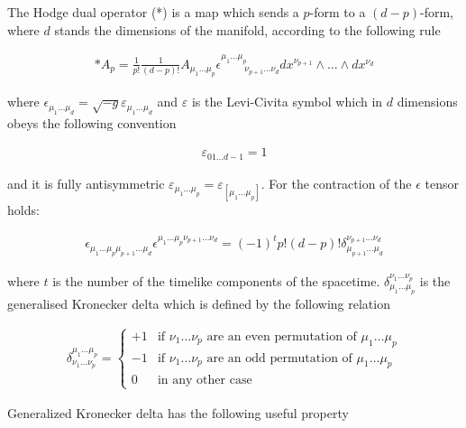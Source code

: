 \documentclass[a4paper,notitlepage]{report}
\begin{document}
The Hodge dual operator (*) is a map which sends a $p$-form to a $(d-p)$-form, where $d$ stands the dimensions of the manifold, according to the following rule

\begin{align}
*A_p = \frac{1}{p!}  \frac{1}{(d-p)!} A_{\mu_{1} \ldots \mu_{p}} \epsilon^{\mu_{1} \ldots \mu_{p}}_{\:\:\:\:\:\:\:\:\:\:\:\: \nu_{p+1} \ldots \nu_{d}} dx^{\nu_{p+1}} \wedge \ldots \wedge dx^{\nu_{d}}
\end{align}

\vspace{0.5em}
where $\epsilon_{\mu_{1} \ldots \mu_{d}} = \sqrt{-g} \varepsilon_{\mu_{1} \ldots \mu_{d}}$ and $\varepsilon$ is the  Levi-Civita symbol which in $d$ dimensions obeys the following convention

\begin{align}
\varepsilon_{0 1 \ldots d-1} = 1
\end{align}

\vspace{0.5em}
and it is fully antisymmetric $\varepsilon_{\mu_{1} \ldots \mu_{p}} = \varepsilon_{[\mu_{1} \ldots \mu_{p}]}$. For the contraction of the $\epsilon$ tensor holds:

\begin{align}
\epsilon_{\mu_{1} \ldots \mu_{p} \mu_{p+1} \ldots \mu_{d}} \epsilon^{\mu_{1} \ldots \mu_{p} \nu_{p+1} \ldots \nu_{d}} = (-1)^t p! (d-p)! \delta_{\mu_{p+1} \ldots \mu_{d}}^{\nu_{p+1} \ldots \nu_{d}}
\end{align}

\vspace{0.5em}
where $t$ is the number of the timelike components of the spacetime. $\delta_{\mu_{1} \ldots \mu_{p}}^{\nu_{1} \ldots \nu_{p}}$ is the generalised Kronecker delta which is defined by the following relation

\begin{align}
\delta^{\mu_{1} \ldots \mu_{p}}_{\nu_{1} \ldots \nu_{p}}=
\begin{cases}
+1 & \text{if $\nu_{1} \ldots \nu_{p}$ are an even permutation of $\mu_{1} \ldots \mu_{p}$}\\
-1 & \text{if $\nu_{1} \ldots \nu_{p}$ are an odd permutation of $\mu_{1} \ldots \mu_{p}$}\\
0 & \text{in any other case}
\end{cases}
\end{align}

\vspace{0.5em}
Generalized Kronecker delta has the following useful property
\end{document}
